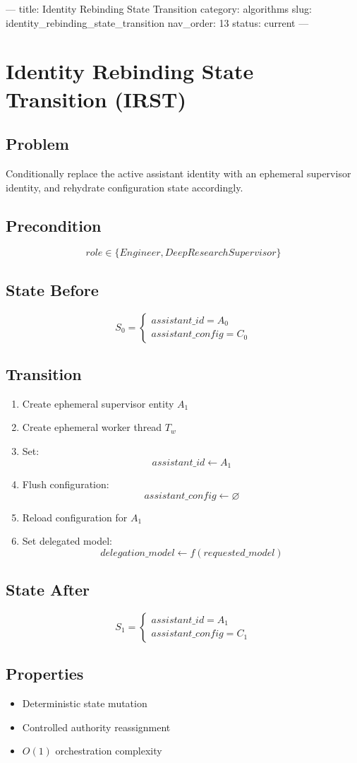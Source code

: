 ---
title: Identity Rebinding State Transition
category: algorithms
slug: identity_rebinding_state_transition
nav_order: 13
status: current
---

\section{Identity Rebinding State Transition (IRST)}

\subsection*{Problem}

Conditionally replace the active assistant identity with an ephemeral supervisor
identity, and rehydrate configuration state accordingly.

\subsection*{Precondition}

\[
role \in \{Engineer, DeepResearchSupervisor\}
\]

\subsection*{State Before}

\[
S_0 = \begin{cases} assistant\_id = A_0 \\ assistant\_config = C_0 \end{cases}
\]

\subsection*{Transition}

\begin{enumerate}
    \item Create ephemeral supervisor entity $A_1$
    \item Create ephemeral worker thread $T_w$
    \item Set:
    \[
    assistant\_id \leftarrow A_1
    \]
    \item Flush configuration:
    \[
    assistant\_config \leftarrow \varnothing
    \]
    \item Reload configuration for $A_1$
    \item Set delegated model:
    \[
    delegation\_model \leftarrow f(requested\_model)
    \]
\end{enumerate}

\subsection*{State After}

\[
S_1 = \begin{cases} assistant\_id = A_1 \\ assistant\_config = C_1 \end{cases}
\]

\subsection*{Properties}

\begin{itemize}
    \item Deterministic state mutation
    \item Controlled authority reassignment
    \item $O(1)$ orchestration complexity
\end{itemize}